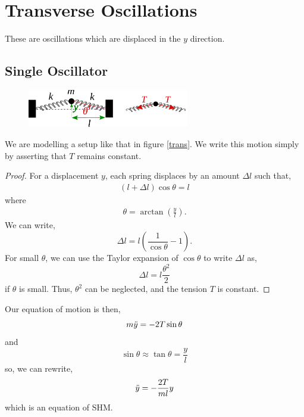 \documentclass{book}
\begin{document}
\section{Transverse Oscillations}
These are oscillations which are displaced in the $y$ direction.
\subsection{Single Oscillator}
\begin{figure}
    \centering
    \includegraphics[width=200pt]{trasnverseosc.pdf}
    \caption{}
    \label{fig:trans}
\end{figure}
We are modelling a setup like that in figure \ref{trans}. We write this motion simply by asserting that $T$ remains constant.
\begin{proof}
    For a displacement $y$, each spring displaces by an amount $\Delta l$ such that,
    \begin{align*}
        (l +  \Delta l) \cos\theta = l 
    \end{align*}
    where
    \begin{align*}
        \theta = \arctan\left(\frac{y}{l}\right).
    \end{align*}
    We can write,
    \begin{equation*}
        \Delta l = l\left(\frac{1}{\cos\theta} - 1\right).
    \end{equation*}
    For small $\theta$, we can use the Taylor expansion of $\cos\theta$ to write $\Delta l$ as,
    \begin{equation}
        \Delta l = l \frac{\theta^2}{2}
    \end{equation}
    if $\theta$ is small. Thus, $\theta^2$ can be neglected, and the tension $T$ is constant.
\end{proof}
\noindent
Our equation of motion is then,
\begin{equation*}
    m \Ddot{y} = -2T\sin\theta
\end{equation*}
and
\begin{equation}
    \sin\theta \approx \tan\theta = \frac{y}{l}
\end{equation}
so, we can rewrite,
\begin{equation}
    \Ddot{y} = -\frac{2T}{ml}y
\end{equation}
which is an equation of SHM.
\end{document}
